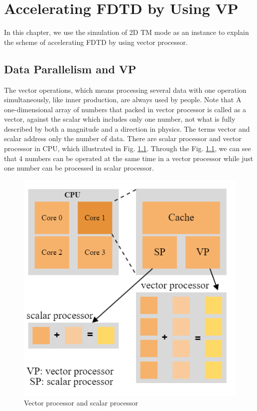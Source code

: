 
\chapter{Accelerating FDTD by Using VP}

In this chapter, we use the simulation of 2D TM mode as an instance to explain the scheme of accelerating FDTD by using vector processor.

\section{Data Parallelism and VP}

The vector operations, which means processing several data with one operation simultaneously, like inner production, are always used by people. Note that A one-dimensional array of numbers that packed in vector processor is called as a vector, against the scalar which includes only one number, not what is fully described by both a magnitude and a direction in physics. The terms vector and scalar address only the number of data. There are scalar processor and vector processor in CPU, which illustrated in Fig. \ref{ch3 fig:vectorprocessor}. Through the Fig. \ref{ch3 fig:vectorprocessor}, we can see that 4 numbers can be operated at the same time in a vector processor while just one number can be processed in scalar processor. 

\begin{figure}[hbtp]
\centering
\includegraphics[width=0.7\linewidth]{pics/vectorprocessor}
\caption{Vector processor and scalar processor}
\label{ch3 fig:vectorprocessor}
\end{figure}

